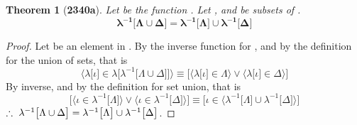 \documentclass[preview]{standalone}
\newtheorem*{theorem*}{Theorem}
\begin{document}
\begin{theorem*}[\textbf{2340a}]
    Let \bm{$\lambda$} be the function 
    . 
    Let \bm{$\Lambda$}, and \bm{$\Delta$} 
    be subsets of .
    \begin{equation*}
        \bm{
        \lambda ^{-1} \big[ \Lambda \cup \Delta \big] 
            = 
        \lambda ^{-1} 
            \big[ \Lambda \big] 
                \cup 
            \lambda^{-1} \big[ \Delta \big]
        }
    \end{equation*}
\end{theorem*}

\begin{proof}
    Let \bm{$\iota$} be an element in .
    By the inverse function for
    , 
    and by the definition for the union of sets, that is 
    \begin{equation*}
        \bigg \langle \lambda 
            \big[ \iota \big] 
                \in 
            \lambda \Big[ 
                \lambda ^{-1} \big[ \Lambda \cup \Delta \big]
            \Big]
        \bigg \rangle
            \equiv
        \bigg[
            \Big \langle \lambda \big[ \iota \big] \in \Lambda \Big \rangle
                \lor 
            \Big \langle \lambda \big[ \iota \big] \in \Delta \Big \rangle
        \bigg]
    \end{equation*}
    By \bm{$\lambda$} inverse, and by the definition for set union, that is
    \begin{equation*}
        \bigg[
            \Big \langle
                \iota \in \lambda^{-1} \big[ \Lambda \big] 
            \Big \rangle
                \lor 
            \Big \langle
                \iota \in \lambda^{-1} \big[ \Delta \big]
            \Big \rangle
        \bigg]
            \equiv
        \bigg[ 
            \iota \in \Big \langle
                \lambda ^{-1} \big[ \Lambda \big] 
                    \cup 
                \lambda ^{-1} \big[ \Delta \big]
            \Big \rangle
        \bigg]
    \end{equation*}
    $\therefore \text{\space} \relax{
    \lambda ^{-1} \big[ \Lambda \cup \Delta \big] 
        = 
    \lambda ^{-1} 
        \big[ \Lambda \big] 
            \cup 
        \lambda^{-1} \big[ \Delta \big]
    }$.
\color{lightgray} \end{proof}
\end{document}
